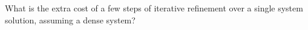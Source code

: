   What is the extra cost of a few steps of iterative refinement over a
  single system solution, assuming a dense system?
